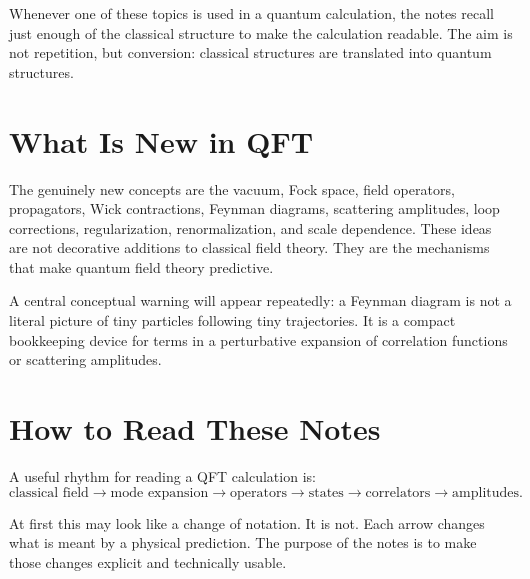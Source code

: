 Whenever one of these topics is used in a quantum calculation, the notes recall
just enough of the classical structure to make the calculation readable. The
aim is not repetition, but conversion: classical structures are translated into
quantum structures.

\section*{What Is New in QFT}

The genuinely new concepts are the vacuum, Fock space, field operators,
propagators, Wick contractions, Feynman diagrams, scattering amplitudes, loop
corrections, regularization, renormalization, and scale dependence. These ideas
are not decorative additions to classical field theory. They are the mechanisms
that make quantum field theory predictive.

A central conceptual warning will appear repeatedly: a Feynman diagram is not a
literal picture of tiny particles following tiny trajectories. It is a compact
bookkeeping device for terms in a perturbative expansion of correlation
functions or scattering amplitudes.

\section*{How to Read These Notes}

A useful rhythm for reading a QFT calculation is:
\[
    \text{classical field}
    \longrightarrow
    \text{mode expansion}
    \longrightarrow
    \text{operators}
    \longrightarrow
    \text{states}
    \longrightarrow
    \text{correlators}
    \longrightarrow
    \text{amplitudes}.
\]

At first this may look like a change of notation. It is not. Each arrow changes
what is meant by a physical prediction. The purpose of the notes is to make
those changes explicit and technically usable.
